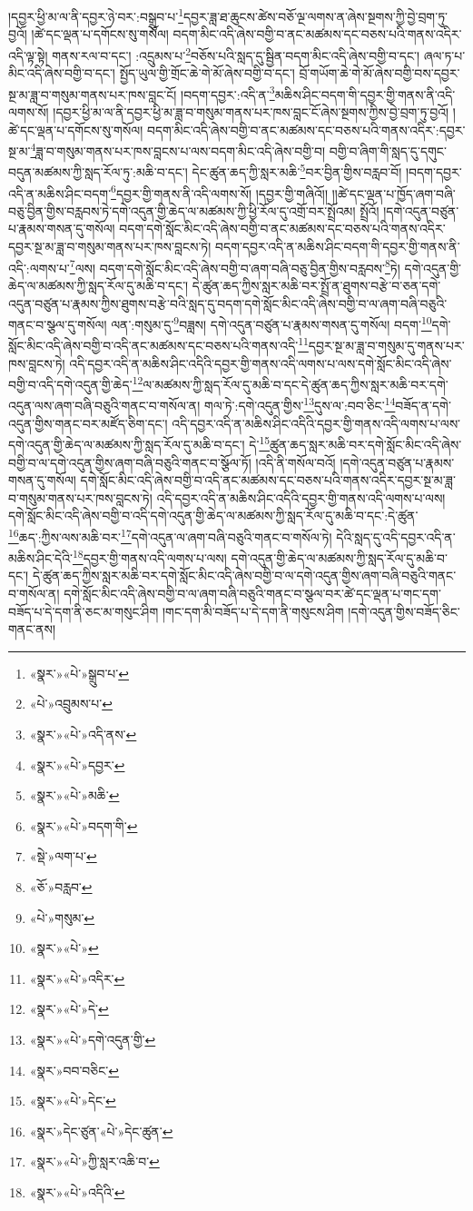 །དབྱར་ཕྱི་མ་ལ་ནི་དབྱར་ཉེ་བར་:བསྒྲུབ་པ་\footnote{«སྣར་»«པེ་»སྒྲུབ་པ་}དབྱར་ཟླ་ཐ་ཆུངས་ཚེས་བཅོ་ལྔ་ལགས་ན་ཞེས་སྔགས་ཀྱི་བྱེ་བྲག་ཏུ་བྱའོ། །ཚེ་དང་ལྡན་པ་དགོངས་སུ་གསོལ། བདག་མིང་འདི་ཞེས་བགྱི་བ་ནང་མཚམས་དང་བཅས་པའི་གནས་འདིར་འདི་ལྟ་སྟེ། གནས་རལ་བ་དང་། :འདྲུམས་པ་\footnote{«པེ་»འབྲུམས་པ་}བཅོས་པའི་སླད་དུ་སྦྱིན་བདག་མིང་འདི་ཞེས་བགྱི་བ་དང་། ཞལ་ཏ་པ་མིང་འདི་ཞེས་བགྱི་བ་དང་། སྤྱོད་ཡུལ་གྱི་གྲོང་ཆེ་གེ་མོ་ཞེས་བགྱི་བ་དང་། བྲོ་གཡོག་ཆེ་གེ་མོ་ཞེས་བགྱི་བས་དབྱར་སྔ་མ་ཟླ་བ་གསུམ་གནས་པར་ཁས་བླང་ངོ། །བདག་དབྱར་:འདི་ན་\footnote{«སྣར་»«པེ་»འདི་ནས་}མཆིས་ཤིང་བདག་གི་དབྱར་གྱི་གནས་ནི་འདི་ལགས་སོ། །དབྱར་ཕྱི་མ་ལ་ནི་དབྱར་ཕྱི་མ་ཟླ་བ་གསུམ་གནས་པར་ཁས་བླང་ངོ་ཞེས་སྔགས་ཀྱིས་བྱེ་བྲག་ཏུ་བྱའོ། །ཚེ་དང་ལྡན་པ་དགོངས་སུ་གསོལ། བདག་མིང་འདི་ཞེས་བགྱི་བ་ནང་མཚམས་དང་བཅས་པའི་གནས་འདིར་:དབྱར་སྔ་མ་\footnote{«སྣར་»«པེ་»དབྱར་}ཟླ་བ་གསུམ་གནས་པར་ཁས་བླངས་པ་ལས་བདག་མིང་འདི་ཞེས་བགྱི་བ། བགྱི་བ་ཞིག་གི་སླད་དུ་དགུང་བདུན་མཚམས་ཀྱི་སླད་རོལ་ཏུ་:མཆི་བ་དང་། དེང་ཚུན་ཆད་ཀྱི་སླར་མཆི་\footnote{«སྣར་»«པེ་»མཆི་}བར་བྱིན་གྱིས་བརླབ་བོ། །བདག་དབྱར་འདི་ན་མཆིས་ཤིང་བདག་\footnote{«སྣར་»«པེ་»བདག་གི་}དབྱར་གྱི་གནས་ནི་འདི་ལགས་སོ། །དབྱར་གྱི་གཞིའོ།། །།ཚེ་དང་ལྡན་པ་ཁྱོད་ཞག་བཞི་བཅུ་བྱིན་གྱིས་བརླབས་ཏེ་དགེ་འདུན་གྱི་ཆེད་ལ་མཚམས་ཀྱི་ཕྱི་རོལ་དུ་འགྲོ་བར་སྤྲོའམ། སྤྲོའོ། །དགེ་འདུན་བཙུན་པ་རྣམས་གསན་དུ་གསོལ། བདག་དགེ་སློང་མིང་འདི་ཞེས་བགྱི་བ་ནང་མཚམས་དང་བཅས་པའི་གནས་འདིར་དབྱར་སྔ་མ་ཟླ་བ་གསུམ་གནས་པར་ཁས་བླངས་ཏེ། བདག་དབྱར་འདི་ན་མཆིས་ཤིང་བདག་གི་དབྱར་གྱི་གནས་ནི་འདི་:ལགས་པ་\footnote{«སྡེ་»ལག་པ་}ལས། བདག་དགེ་སློང་མིང་འདི་ཞེས་བགྱི་བ་ཞག་བཞི་བཅུ་བྱིན་གྱིས་བརླབས་\footnote{«ཅོ་»བརླབ་}ཏེ། དགེ་འདུན་གྱི་ཆེད་ལ་མཚམས་ཀྱི་སླད་རོལ་དུ་མཆི་བ་དང་། དེ་ཚུན་ཆད་ཀྱིས་སླར་མཆི་བར་སྤྲོ་ན་ཐུགས་བརྩེ་བ་ཅན་དགེ་འདུན་བཙུན་པ་རྣམས་ཀྱིས་ཐུགས་བརྩེ་བའི་སླད་དུ་བདག་དགེ་སློང་མིང་འདི་ཞེས་བགྱི་བ་ལ་ཞག་བཞི་བཅུའི་གནང་བ་སྩལ་དུ་གསོལ། ལན་:གསུམ་དུ་\footnote{«པེ་»གསུམ་}བཟླས། དགེ་འདུན་བཙུན་པ་རྣམས་གསན་དུ་གསོལ། བདག་\footnote{«སྣར་»«པེ་»}དགེ་སློང་མིང་འདི་ཞེས་བགྱི་བ་འདི་ནང་མཚམས་དང་བཅས་པའི་གནས་འདི་\footnote{«སྣར་»«པེ་»འདིར་}དབྱར་སྔ་མ་ཟླ་བ་གསུམ་དུ་གནས་པར་ཁས་བླངས་ཏེ། འདི་དབྱར་འདི་ན་མཆིས་ཤིང་འདིའི་དབྱར་གྱི་གནས་འདི་ལགས་པ་ལས་དགེ་སློང་མིང་འདི་ཞེས་བགྱི་བ་འདི་དགེ་འདུན་གྱི་ཆེད་\footnote{«སྣར་»«པེ་»དེ་}ལ་མཚམས་ཀྱི་སླད་རོལ་དུ་མཆི་བ་དང་དེ་ཚུན་ཆད་ཀྱིས་སླར་མཆི་བར་དགེ་འདུན་ལས་ཞག་བཞི་བཅུའི་གནང་བ་གསོལ་ན། གལ་ཏེ་:དགེ་འདུན་གྱིས་\footnote{«སྣར་»«པེ་»དགེ་འདུན་གྱི་}དུས་ལ་:བབ་ཅིང་\footnote{«སྣར་»བབ་བཅིང་}བཟོད་ན་དགེ་འདུན་གྱིས་གནང་བར་མཛོད་ཅིག་དང་། འདི་དབྱར་འདི་ན་མཆིས་ཤིང་འདིའི་དབྱར་གྱི་གནས་འདི་ལགས་པ་ལས་དགེ་འདུན་གྱི་ཆེད་ལ་མཚམས་ཀྱི་སླད་རོལ་དུ་མཆི་བ་དང་། དེ་\footnote{«སྣར་»«པེ་»དེང་}ཚུན་ཆད་སླར་མཆི་བར་དགེ་སློང་མིང་འདི་ཞེས་བགྱི་བ་ལ་དགེ་འདུན་གྱིས་ཞག་བཞི་བཅུའི་གནང་བ་སྩོལ་ཏོ། །འདི་ནི་གསོལ་བའོ། །དགེ་འདུན་བཙུན་པ་རྣམས་གསན་དུ་གསོལ། དགེ་སློང་མིང་འདི་ཞེས་བགྱི་བ་འདི་ནང་མཚམས་དང་བཅས་པའི་གནས་འདིར་དབྱར་སྔ་མ་ཟླ་བ་གསུམ་གནས་པར་ཁས་བླངས་ཏེ། འདི་དབྱར་འདི་ན་མཆིས་ཤིང་འདིའི་དབྱར་གྱི་གནས་འདི་ལགས་པ་ལས། དགེ་སློང་མིང་འདི་ཞེས་བགྱི་བ་འདི་དགེ་འདུན་གྱི་ཆེད་ལ་མཚམས་ཀྱི་སླད་རོལ་དུ་མཆི་བ་དང་:དེ་ཚུན་\footnote{«སྣར་»དེང་ཙུན་«པེ་»དེང་ཚུན་}ཆད་:ཀྱིས་ལས་མཆི་བར་\footnote{«སྣར་»«པེ་»ཀྱི་སླར་འཆི་བ་}དགེ་འདུན་ལ་ཞག་བཞི་བཅུའི་གནང་བ་གསོལ་ཏེ། དེའི་སླད་དུ་འདི་དབྱར་འདི་ན་མཆིས་ཤིང་དེའི་\footnote{«སྣར་»«པེ་»འདིའི་}དབྱར་གྱི་གནས་འདི་ལགས་པ་ལས། དགེ་འདུན་གྱི་ཆེད་ལ་མཚམས་ཀྱི་སླད་རོལ་དུ་མཆི་བ་དང་། དེ་ཚུན་ཆད་ཀྱིས་སླར་མཆི་བར་དགེ་སློང་མིང་འདི་ཞེས་བགྱི་བ་ལ་དགེ་འདུན་གྱིས་ཞག་བཞི་བཅུའི་གནང་བ་གསོལ་ན། དགེ་སློང་མིང་འདི་ཞེས་བགྱི་བ་ལ་ཞག་བཞི་བཅུའི་གནང་བ་སྩལ་བར་ཚེ་དང་ལྡན་པ་གང་དག་བཟོད་པ་དེ་དག་ནི་ཅང་མ་གསུང་ཤིག །གང་དག་མི་བཟོད་པ་དེ་དག་ནི་གསུངས་ཤིག །དགེ་འདུན་གྱིས་བཟོད་ཅིང་གནང་ནས། 
